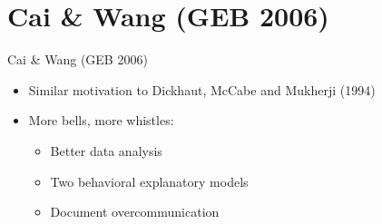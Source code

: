 \documentclass{beamer}
\begin{document}
\section{Cai \& Wang (GEB 2006)}
\begin{frame}{Cai \& Wang (GEB 2006)}
	\begin{itemize}
		\item Similar motivation to Dickhaut, McCabe and Mukherji (1994)
		\item More bells, more whistles:
		\begin{itemize}
			\item Better data analysis
			\item Two behavioral explanatory models
			\item Document overcommunication
		\end{itemize}
	\end{itemize}
\end{frame}
\end{document}
